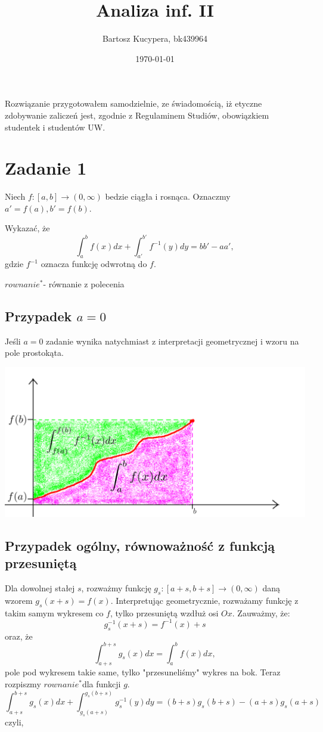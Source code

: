 \documentclass{article}
\title{Analiza inf. II}
\author{Bartosz Kucypera, bk439964}
\date{\today}
\def\rw{$rownanie^*$}
\begin{document}
\maketitle

Rozwiązanie przygotowałem samodzielnie, ze świadomością, iż etyczne zdobywanie zaliczeń jest, zgodnie z Regulaminem Studiów, obowiązkiem studentek i studentów UW.

\section*{Zadanie 1}
Niech $f:[a,b] \to (0,\infty)$ bedzie ciągła i rosnąca. Oznaczmy $a'=f(a),b'=f(b)$.

Wykazać, że 
$$\int_a^bf(x)dx+\int_{a'}^{b'}f^{-1}(y)dy=bb' - aa',$$
gdzie $f^{-1}$ oznacza funkcję odwrotną do $f$.

\rw - równanie z polecenia

\subsection*{Przypadek $a=0$}
Jeśli $a=0$ zadanie wynika natychmiast z interpretacji geometrycznej i wzoru na pole prostokąta.

\includegraphics[scale=0.4]{jd.png}

\newpage


\subsection*{Przypadek ogólny, równoważność z funkcją przesuniętą}
Dla dowolnej stałej $s$, rozważmy funkcję $g_s:[a+s,b+s] \to (0, \infty)$ daną wzorem $g_s(x+s) = f(x)$. \newline
Interpretując geometrycznie, rozważamy funkcję z takim samym wykresem co $f$, tylko przesuniętą wzdłuż osi $Ox$. \newline 
Zauważmy, że:
$$g_s^{-1}(x+s) = f^{-1}(x) + s$$
oraz, że
$$\int_{a+s}^{b+s}g_s(x)dx = \int_a^bf(x)dx,$$
pole pod wykresem takie same, tylko "przesuneliśmy" wykres na bok. \newline
\newline
Teraz rozpiszmy \rw dla funkcji $g$.
$$\int_{a+s}^{b+s}g_s(x)dx + \int_{g_s(a+s)}^{g_s(b+s)}g_s^{-1}(y)dy = (b+s)g_s(b+s)-(a+s)g_s(a+s)$$
czyli,
\end{document}
